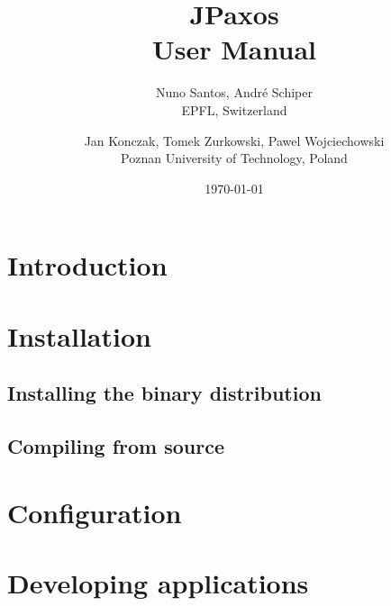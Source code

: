 \documentclass[11pt]{article}
\title{JPaxos\\User Manual}
\author{Nuno Santos, Andr\'e Schiper\\EPFL, Switzerland 
	\and Jan Konczak, Tomek Zurkowski, Pawel Wojciechowski\\Poznan University of Technology, Poland}
\date{\today}
\begin{document}
\maketitle

\section{Introduction}


\section{Installation}

\subsection{Installing the binary distribution}

\subsection{Compiling from source}



\section{Configuration}



\section{Developing applications}




\end{document}
